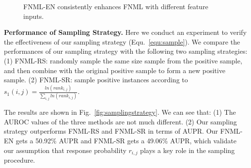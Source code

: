 \documentclass[journal]{IEEEtran}
\begin{document}
\begin{figure}[!ht]
\centering
{}

\caption{FNML-EN consistently enhances FNML with different feature inputs.}\label{fig:stability-EN}
\end{figure}

\textbf{Performance of Sampling Strategy.} 
Here we conduct an experiment to verify the effectiveness of our sampling strategy (Equ.~\ref{equ:sample}).  We compare the performances of our sampling strategy with the following two sampling strategies: (1) FNML-RS: randomly sample the same size sample from the positive sample, and then combine with the original positive sample to form a new positive sample.  (2) FNML-SR: sample positive instances according to $
s_{1}(i,j) = \frac{ln(rank_{i,j})}{\sum_{i,j}{ln(rank_{i,j})}}$. 

The results are shown in Fig.~\ref{fig:samplingstrategy}. We can see that: (1) The AUROC values of the three methods are not much different. (2) Our sampling strategy outperforms FNML-RS and FNML-SR in terms of AUPR. Our FNML-EN gets a 50.92\% AUPR and FNML-SR gets a 49.06\% AUPR, which validate our assumption that response probability $r_{i,j}$ plays a key role in the sampling procedure.
\end{document}
